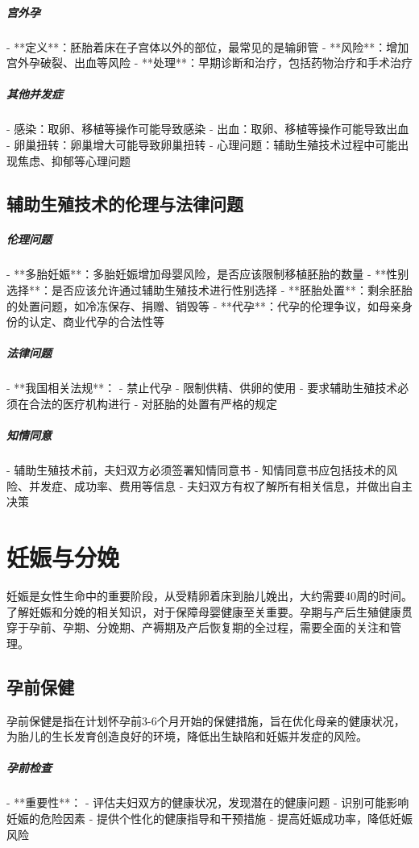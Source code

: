 \begin{enumerate}
\subparagraph{宫外孕}

- **定义**：胚胎着床在子宫体以外的部位，最常见的是输卵管
- **风险**：增加宫外孕破裂、出血等风险
- **处理**：早期诊断和治疗，包括药物治疗和手术治疗

\subparagraph{其他并发症}

- 感染：取卵、移植等操作可能导致感染
- 出血：取卵、移植等操作可能导致出血
- 卵巢扭转：卵巢增大可能导致卵巢扭转
- 心理问题：辅助生殖技术过程中可能出现焦虑、抑郁等心理问题

\subsection{辅助生殖技术的伦理与法律问题}

\subparagraph{伦理问题}

- **多胎妊娠**：多胎妊娠增加母婴风险，是否应该限制移植胚胎的数量
- **性别选择**：是否应该允许通过辅助生殖技术进行性别选择
- **胚胎处置**：剩余胚胎的处置问题，如冷冻保存、捐赠、销毁等
- **代孕**：代孕的伦理争议，如母亲身份的认定、商业代孕的合法性等

\subparagraph{法律问题}

- **我国相关法规**：
  - 禁止代孕
  - 限制供精、供卵的使用
  - 要求辅助生殖技术必须在合法的医疗机构进行
  - 对胚胎的处置有严格的规定

\subparagraph{知情同意}

- 辅助生殖技术前，夫妇双方必须签署知情同意书
- 知情同意书应包括技术的风险、并发症、成功率、费用等信息
- 夫妇双方有权了解所有相关信息，并做出自主决策

\section{妊娠与分娩}

妊娠是女性生命中的重要阶段，从受精卵着床到胎儿娩出，大约需要40周的时间。了解妊娠和分娩的相关知识，对于保障母婴健康至关重要。孕期与产后生殖健康贯穿于孕前、孕期、分娩期、产褥期及产后恢复期的全过程，需要全面的关注和管理。

\subsection{孕前保健}

孕前保健是指在计划怀孕前3-6个月开始的保健措施，旨在优化母亲的健康状况，为胎儿的生长发育创造良好的环境，降低出生缺陷和妊娠并发症的风险。

\subparagraph{孕前检查}

- **重要性**：
  - 评估夫妇双方的健康状况，发现潜在的健康问题
  - 识别可能影响妊娠的危险因素
  - 提供个性化的健康指导和干预措施
  - 提高妊娠成功率，降低妊娠风险


\end{enumerate}
